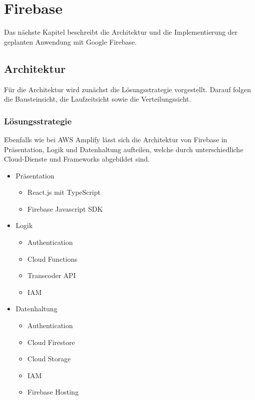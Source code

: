 \chapter{Firebase}

Das nächste Kapitel beschreibt die Architektur und die Implementierung der geplanten Anwendung mit Google Firebase.

\section{Architektur}

Für die Architektur wird zunächst die Lösungsstrategie vorgestellt. Darauf folgen die Bausteinsicht, die Laufzeitsicht sowie die Verteilungssicht.

\subsection{Lösungsstrategie}

Ebenfalls wie bei \ac{AWS} Amplify lässt sich die Architektur von Firebase in Präsentation, Logik und Datenhaltung aufteilen, welche durch unterschiedliche Cloud-Dienste und Frameworks abgebildet sind.
\begin{itemize}
  \item Präsentation
    \begin{itemize}
      \item React.js mit TypeScript
      \item Firebase Javascript SDK
    \end{itemize}
  \item Logik
    \begin{itemize}
      \item Authentication
      \item Cloud Functions
      \item Transcoder API
      \item IAM
    \end{itemize}
  \item Datenhaltung
    \begin{itemize}
      \item Authentication
      \item Cloud Firestore
      \item Cloud Storage
      \item IAM
      \item Firebase Hosting
    \end{itemize}
\end{itemize}

